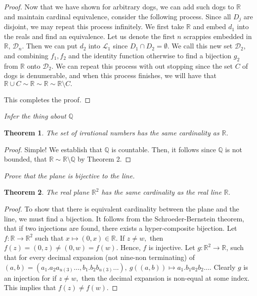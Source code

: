 \documentclass[letter]{article}
\newtheorem{theorem}{Theorem}
\newenvironment{menumerate}{%
  \edef\backupindent{\the\parindent}%
  \enumerate%
  \setlength{\parindent}{\backupindent}%
}{\endenumerate}
\begin{document}
\begin{menumerate}
\begin{menumerate}
\begin{proof}
					  Now that we have shown for arbitrary dogs, we can add such dogs to $\mathbb{R}$ and maintain cardinal equivalence, consider the following process. Since all $D_j$ are disjoint, we may repeat this process infinitely. We first take $\mathbb{R}$ and embed $d_1$ into the reals and find an equivalence. Let us denote the first $n$ scrappies embedded in $\mathbb{R}$, $\mathcal{D}_n$. Then we can put $d_2$ into $\mathcal{L}_1$ since $D_1 \cap D_2 = \emptyset$. We call this new set $\mathcal{D}_2$, and combining $f_1,f_2$ and the identity function otherwise to find a bijection $g_2$ from $\mathbb{R}$ onto $\mathcal{D}_2.$ We can repeat this process with out stopping since the set $C$ of dogs is denumerable, and when this process finishes, we will have that $\mathbb{R} \cup C \sim \mathbb{R} \sim \mathbb{R} \sim \mathbb{R} \setminus C.$

					  This completes the proof. 
 
	 		  \end{proof}

	 		  \item \textit{Infer the thing about $\mathbb{Q}$ } 
	 		  	\begin{theorem}
	 		  		The set of irrational numbers has the same cardinality as $\mathbb{R}.$
	 		  	\end{theorem}
	 		  	\begin{proof}
	 		  	Simple! We establish that $\mathbb{Q}$ is countable. Then, it follows since $\mathbb{Q}$ is not bounded, that $\mathbb{R} \sim \mathbb{R} \setminus \mathbb{Q}$ by Theorem 2.
	 		  	\end{proof}
		 \end{menumerate} 
		 \item \textit{Prove that the plane is bijective to the line.}
		 	\begin{theorem}
		 		The real plane $\mathbb{R}^2$ has the same cardinality as the real line $\mathbb{R}.$
		 	\end{theorem}
		 	\begin{proof}
		 		To show that there is equivalent cardinality between the plane and the line, we must find a bijection. It follows from the Schroeder-Bernstein theorem, that if two injections are found, there exists a hyper-composite bijection. Let $f: \mathbb{R} \to \mathbb{R}^2$ such that $x \mapsto (0, x) \in \mathbb{R}.$ If $z\neq w,$ then $f(z) = (0,z) \neq (0,w) = f(w).$ Hence, $f$ is injective. Let $g:\mathbb{R}^2 \to \mathbb{R}$, such that for every decimal expansion (not nine-non terminating) of $(a,b) = (a_1.a_2a_{u(3)}\dots,b_1.b_2b_{u(3)}\dots),\  g\left((a,b)\right) \mapsto a_1.b_1a_2b_2\dots.$ Clearly $g$ is an injection for if $z \neq w,$ then the decimal expansion is non-equal at some index. This implies that $f(z) \neq f(w)$.


\end{proof}
\end{menumerate}
\end{document}
